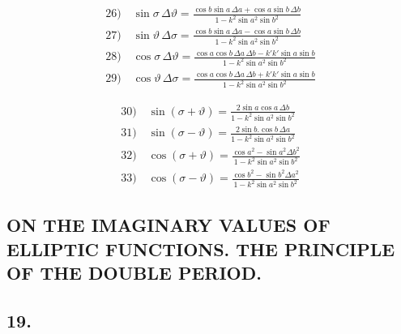 \documentclass{article}
\begin{document}
\[\begin{gathered}
\text{26)}\quad\sin\sigma\,\Delta\vartheta=\frac{\cos b\sin a\,\Delta a+\cos a\sin b\,\Delta b}{1-k^{2}\sin a^{2}\sin b^{2}}\\[1ex]
\text{27)}\quad\sin\vartheta\,\Delta\sigma=\frac{\cos b\sin a\,\Delta a-\cos a\sin b\,\Delta b}{1-k^{2}\sin a^{2}\sin b^{2}}\\[1ex]
\text{28)}\quad\cos\sigma\,\Delta\vartheta=\frac{\cos a\cos b\,\Delta a\,\Delta b-k'k'\sin a\sin b}{1-k^{2}\sin a^{2}\sin b^{2}}\\[1ex]
\text{29)}\quad\cos\vartheta\,\Delta\sigma=\frac{\cos a\cos b\,\Delta a\,\Delta b+k'k'\sin a\sin b}{1-k^{2}\sin a^{2}\sin b^{2}}
\end{gathered}
\]

\[
\begin{gathered}
\text{30)}\quad\sin(\sigma+\vartheta)=\frac{2\sin a\cos a\,\Delta b}{1-k^{2}\sin a^{2}\sin b^{2}}\\[1ex]
\text{31)}\quad\sin(\sigma-\vartheta)=\frac{2\sin b.\cos b\,\Delta a}{1-k^{2}\sin a^{2}\sin b^{2}}\\[1ex]
\text{32)}\quad\cos(\sigma+\vartheta)=\frac{\cos a^{2}-\sin a^{2}\Delta b^{2}}{1-k^{2}\sin a^{2}\sin b^{2}}\\[1ex]
\text{33)}\quad\cos(\sigma-\vartheta)=\frac{\cos b^{2}-\sin b^{2}\Delta a^{2}}{1-k^{2}\sin a^{2}\sin b^{2}}
\end{gathered}
\]

\subsection*{ON THE IMAGINARY VALUES OF ELLIPTIC FUNCTIONS. THE PRINCIPLE OF THE DOUBLE PERIOD.}

\subsection*{19.}
\end{document}
